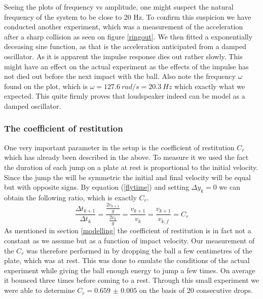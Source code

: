 \documentclass[12pt,oneside,a4paper]{article}
\numberwithin{equation}{section}
\begin{document}
{{{{Seeing the plots of frequency vs amplitude, one might suspect the natural frequency of the system to be close to 20 Hz. To confirm this suspicion we have conducted another experiment, which was a measurement of the acceleration after a sharp collision as seen on figure \ref{ringout}. We then fitted a exponentially deceasing sine function, as that is the acceleration anticipated from a damped oscillator. As it is apparent the impulse response dies out rather slowly. This might have an effect on the actual experiment as the effects of the impulse has not died out before the next impact with the ball.  Also note the frequency $\omega$ found on the plot, which is $\omega = \SI{127.6}{rad/s} = \SI{20.3}{Hz}$ which exactly what we expected. This quite firmly proves that loudspeaker indeed can be model as a damped oscillator.

\subsubsection{The coefficient of restitution}
One very important parameter in the setup is the coefficient of restitution $C_r$ which has already been described in the above. To measure it we used the fact the duration of each jump on a plate at rest is proportional to the initial velocity. Since the jump the will be symmetric the initial and final velocity will be equal but with opposite signs. By equation (\ref{flytime}) and setting $\Delta y_k=0$ we can obtain the following ratio, which is exactly $C_r$.
\begin{equation}
	\frac{\Delta t_{k+1}}{\Delta t_{k}}= \frac{\frac{2v_{k+1}}{g}}{\frac{2v_{k}}{g}} = \frac{v_{k+1}}{v_k} = \frac{v_{k+1}}{v_{k,f}} = C_r
\end{equation}
As mentioned in section \ref{modelling} the coefficient of restitution is in fact not a constant as we assume but as a function of impact velocity. Our measurement of the $C_r$ was therefore performed in by dropping the ball a few centimetres of the plate, which was at rest. This was done to emulate the conditions of the actual experiment while giving the ball enough energy to jump a few times. On average it bounced three times before coming to a rest. Through this small experiment we were able to determine $C_r= \num{0.659(5)}$ on the basis of 20 consecutive drops. 

}}}}
\end{document}
